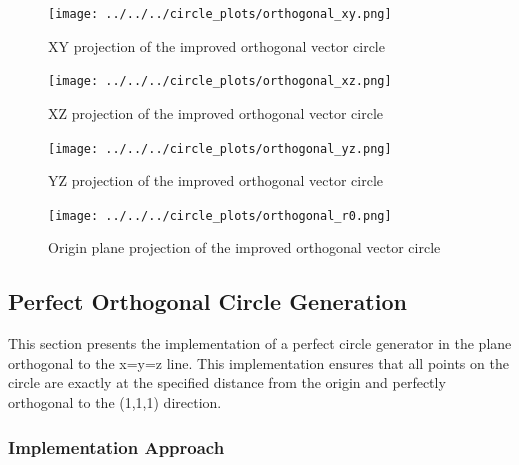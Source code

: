 \begin{figure}[H]
    \centering
    \begin{minipage}{0.48\textwidth}
        \centering
        \texttt{[image: ../../../circle\_plots/orthogonal\_xy.png]}
        \caption{XY projection of the improved orthogonal vector circle}
        \label{fig:example_orthogonal_xy}
    \end{minipage}\hfill
    \begin{minipage}{0.48\textwidth}
        \centering
        \texttt{[image: ../../../circle\_plots/orthogonal\_xz.png]}
        \caption{XZ projection of the improved orthogonal vector circle}
        \label{fig:example_orthogonal_xz}
    \end{minipage}
\end{figure}

\begin{figure}[H]
    \centering
    \begin{minipage}{0.48\textwidth}
        \centering
        \texttt{[image: ../../../circle\_plots/orthogonal\_yz.png]}
        \caption{YZ projection of the improved orthogonal vector circle}
        \label{fig:example_orthogonal_yz}
    \end{minipage}\hfill
    \begin{minipage}{0.48\textwidth}
        \centering
        \texttt{[image: ../../../circle\_plots/orthogonal\_r0.png]}
        \caption{Origin plane projection of the improved orthogonal vector circle}
        \label{fig:example_orthogonal_origin}
    \end{minipage}
\end{figure}








\subsection{Perfect Orthogonal Circle Generation}

This section presents the implementation of a perfect circle generator in the plane orthogonal to the x=y=z line. This implementation ensures that all points on the circle are exactly at the specified distance from the origin and perfectly orthogonal to the (1,1,1) direction.

\subsubsection{Implementation Approach}

